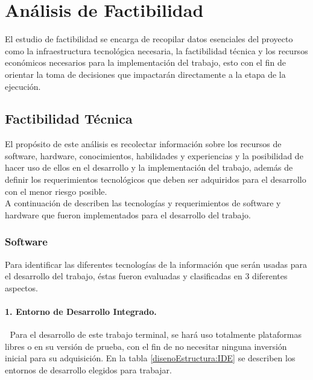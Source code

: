 \section{Análisis de Factibilidad}
El estudio de factibilidad se encarga de recopilar datos esenciales del proyecto como la infraestructura tecnológica necesaria, la factibilidad técnica y los recursos económicos necesarios para la implementación del trabajo, esto con el fin de orientar la toma de decisiones que impactarán directamente a la etapa de la ejecución.

\subsection{Factibilidad Técnica}
El propósito  de este análisis es recolectar información sobre los recursos de software, hardware, conocimientos, habilidades y experiencias y la posibilidad de hacer uso de ellos en el desarrollo y la implementación del trabajo, además de definir los requerimientos tecnológicos que deben ser adquiridos para el desarrollo con el menor riesgo posible.\\

A continuación de describen las tecnologías y requerimientos de software y hardware que fueron implementados para el desarrollo del trabajo.

\subsubsection{Software}
Para identificar las diferentes tecnologías de la información que serán usadas para el desarrollo del trabajo, éstas fueron evaluadas y clasificadas en 3 diferentes aspectos.\\

\paragraph{1. Entorno de Desarrollo Integrado.} \textcolor{White}{.} \newline
Para el desarrollo de este trabajo terminal, se hará uso totalmente plataformas libres o en su versión de prueba, con el fin de no necesitar ninguna inversión inicial para su adquisición. En la tabla \ref{disenoEstructura:IDE} se describen los entornos de desarrollo elegidos para trabajar.

